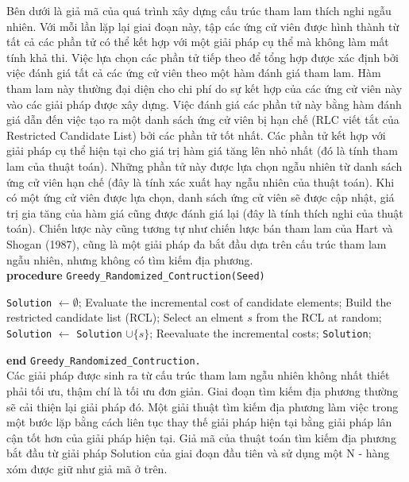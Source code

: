 \documentclass[14pt,a4paper]{report}
\begin{document}
Bên dưới là giả mã của quá trình xây dựng  cấu trúc tham lam thích nghi ngẫu nhiên. Với mỗi lần lặp lại giai đoạn này, tập các ứng cử viên được hình thành từ tất cả các phần tử có thể kết hợp với một giải pháp cụ thể mà không làm mất tính khả thi. Việc lựa chọn các phần tử tiếp theo để tổng hợp được xác định bởi việc đánh giá tất cả các ứng cử viên theo một hàm đánh giá tham lam. Hàm tham lam này thường đại diện cho chi phí do sự kết hợp của các ứng cử viên này vào các giải pháp được xây dựng. Việc đánh giá các phần tử này bằng hàm đánh giá dẫn đến việc tạo ra một danh sách ứng cử viên bị hạn chế (RLC viết tắt của Restricted Candidate List) bởi các phần tử tốt nhất. Các phần tử kết hợp với giải pháp cụ thể hiện tại cho giá trị hàm giá tăng lên nhỏ nhất (đó là tính tham lam của thuật toán). Những phần tử này được lựa chọn ngẫu nhiên từ danh sách ứng cử viên hạn chế (đây là tính xác xuất hay ngẫu nhiên của thuật toán). Khi có một ứng cử viên được lựa chọn, danh sách ứng cử viên sẽ được cập nhật, giá trị gia tăng của hàm giá cũng được đánh giá lại (đây là tính thích nghi của thuật toán). Chiến lược này cũng tương tự như chiến lược bán tham lam của Hart và Shogan (1987), cũng là một giải pháp đa bắt đầu dựa trên cấu trúc tham lam ngẫu nhiên, nhưng không có tìm kiếm địa phương.\\

{\bf procedure} \texttt{Greedy\_Randomized\_Contruction(Seed)}
\begin{algorithmic} [1] 
	\STATE \texttt{Solution} $\leftarrow \emptyset$;
	\STATE Evaluate the incremental cost of candidate elements;
	\STATE Build the restricted candidate list (RCL);
	\STATE Select an elment $s$ from the RCL at random;
	\STATE \texttt{Solution} $\leftarrow$ \texttt{Solution} $\cup \{s\}$;
	\STATE Reevaluate the incremental costs;
	\ENDWHILE
	 \texttt{Solution};
\end{algorithmic}
{\bf end} \texttt{Greedy\_Randomized\_Contruction.}\\

Các giải pháp được sinh ra từ cấu trúc tham lam ngẫu nhiên không nhất thiết phải tối ưu, thậm chí là tối ưu đơn giản. Giai đoạn tìm kiếm địa phương thường sẽ cải thiện lại giải pháp đó. Một giải thuật tìm kiếm địa phương làm việc trong một bước lặp bằng cách liên tục thay thế giải pháp hiện tại bằng giải pháp lân cận tốt hơn của giải pháp hiện tại. Giả mã của thuật toán tìm kiếm địa phương bắt đầu từ giải pháp Solution của giai đoạn đầu tiên và sử dụng một N - hàng xóm được giữ như giả mã ở trên.\\
\end{document}
